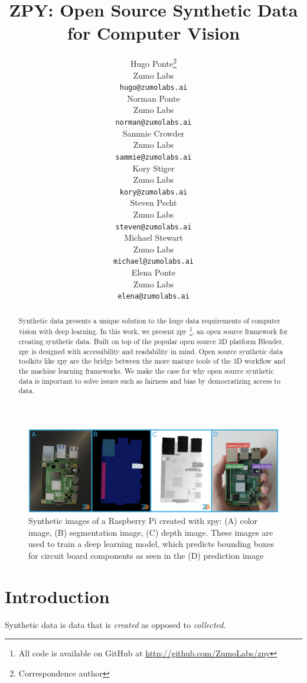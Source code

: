 \documentclass{article}
\title{ZPY: Open Source Synthetic Data for Computer Vision}
\author{
	{\hspace{1mm}Hugo Ponte}\footnote{Correspondence author} \\ 
	Zumo Labs \\
	\texttt{hugo@zumolabs.ai} \\
	\And
	{\hspace{1mm}Norman Ponte} \\
	Zumo Labs \\
	\texttt{norman@zumolabs.ai} \\
	\And
	{\hspace{1mm}Sammie Crowder} \\
	Zumo Labs \\
	\texttt{sammie@zumolabs.ai} \\
	\And
	{\hspace{1mm}Kory Stiger} \\
	Zumo Labs \\
	\texttt{kory@zumolabs.ai} \\
	\And
	{\hspace{1mm}Steven Pecht} \\
	Zumo Labs \\
	\texttt{steven@zumolabs.ai} \\
	\And
	{\hspace{1mm}Michael Stewart} \\
	Zumo Labs \\
	\texttt{michael@zumolabs.ai} \\
	\And
	{\hspace{1mm}Elena Ponte} \\
	Zumo Labs \\
	\texttt{elena@zumolabs.ai} \\
}
\date{}
\begin{document}
\maketitle

\begin{abstract}
Synthetic data presents a unique solution to the huge data requirements of computer vision with deep learning. In this work, we present zpy \footnote{All code is available on GitHub at \url{http://github.com/ZumoLabs/zpy}}, an open source framework for creating synthetic data. Built on top of the popular open source 3D platform Blender, zpy is designed with accessibility and readability in mind. Open source synthetic data toolkits like zpy are the bridge between the more mature tools of the 3D workflow and the machine learning frameworks. We make the case for why open source synthetic data is important to solve issues such as fairness and bias by democratizing access to data.
\end{abstract}


\begin{figure}[!ht]
	\centering
	\includegraphics[width=\textwidth]{cover.png}
	\caption{Synthetic images of a Raspberry Pi created with zpy: (A) color image, (B) segmentation image, (C) depth image. These images are used to train a deep learning model, which predicts bounding boxes for circuit board components as seen in the (D) prediction image}
	\label{fig:fig1}
\end{figure}

\section{Introduction}
\label{sec:introduction}

Synthetic data is data that is \emph{created} as opposed to \emph{collected}.
\end{document}
